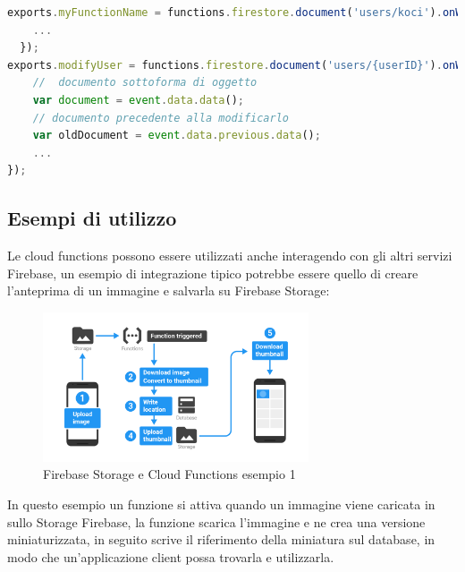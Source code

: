 \begin{lstlisting}[language=javascript,caption={Cloud functions esempio 1 }]
exports.myFunctionName = functions.firestore.document('users/koci').onWrite((event) => {
    ...
  });
exports.modifyUser = functions.firestore.document('users/{userID}').onWrite(event => {
    //  documento sottoforma di oggetto
    var document = event.data.data();
    // documento precedente alla modificarlo
    var oldDocument = event.data.previous.data();
    ...
});
\end{lstlisting}


\newpage              %
\subsection{Esempi di utilizzo}
Le cloud functions possono essere utilizzati anche interagendo con gli altri servizi Firebase, un esempio di integrazione tipico potrebbe essere quello di creare l'anteprima di un immagine e salvarla su Firebase Storage:

\begin{figure}[!hb]

  \includegraphics[width=0.7\textwidth]{immagini/functions_ex1.png}
  \caption{Firebase Storage e Cloud Functions esempio 1}\label{fig:Firebase Storage e Cloud Functions esempio 1}
\end{figure}

In questo esempio un funzione si attiva quando un immagine viene caricata in sullo Storage Firebase, la funzione scarica l'immagine e ne crea una versione miniaturizzata, in seguito scrive il riferimento della miniatura sul database, in modo che un'applicazione client possa trovarla e utilizzarla.\\
%
%

